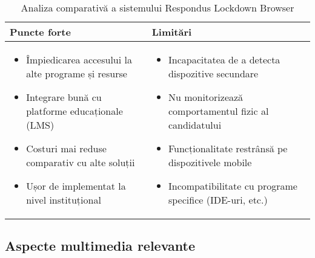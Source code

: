 \documentclass[12pt,a4paper]{article}
\begin{document}
\begin{table}[H] %
    \centering
    \begin{tabular}{|p{8.5cm}|p{8.5cm}|}
    \hline
    \textbf{Puncte forte} & \textbf{Limitări} \\
    \hline
    \begin{itemize}
        \item Împiedicarea accesului la alte programe și resurse
        \item Integrare bună cu platforme educaționale (LMS)
        \item Costuri mai reduse comparativ cu alte soluții
        \item Ușor de implementat la nivel instituțional
    \end{itemize} & 
    \begin{itemize}
        \item Incapacitatea de a detecta dispozitive secundare
        \item Nu monitorizează comportamentul fizic al candidatului
        \item Funcționalitate restrânsă pe dispozitivele mobile
        \item Incompatibilitate cu programe specifice (IDE-uri, etc.)
    \end{itemize} \\
    \hline
    \end{tabular}
    \caption{Analiza comparativă a sistemului Respondus Lockdown Browser}
\end{table}

\subsection{Aspecte multimedia relevante}
\end{document}

